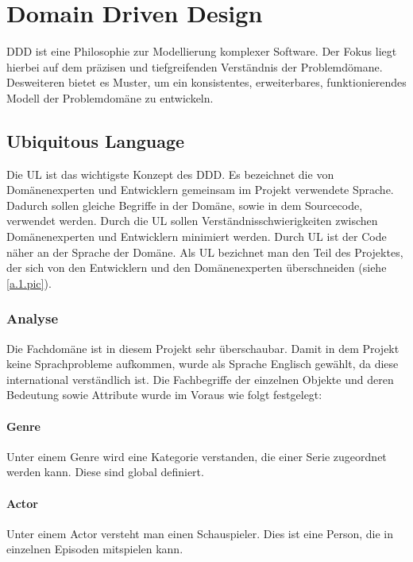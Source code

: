 
\chapter{Domain Driven Design}
\ac{DDD} ist eine Philosophie zur Modellierung komplexer Software. Der Fokus liegt hierbei auf dem präzisen und tiefgreifenden Verständnis der Problemdömane. Desweiteren bietet es Muster, um ein konsistentes, erweiterbares, funktionierendes Modell der Problemdomäne zu entwickeln.

\section{Ubiquitous Language}
Die \ac{UL} ist das wichtigste Konzept des \ac{DDD}. Es bezeichnet die von Domänenexperten und Entwicklern gemeinsam im Projekt verwendete Sprache. Dadurch sollen gleiche Begriffe in der Domäne, sowie in dem Sourcecode, verwendet werden. Durch die \ac{UL} sollen Verständnisschwierigkeiten zwischen Domänenexperten und Entwicklern minimiert werden. Durch \ac{UL} ist der Code näher an der Sprache der Domäne. Als \ac{UL} bezichnet man den Teil des Projektes, der sich von den Entwicklern und den Domänenexperten überschneiden (siehe \cref{a.1.pic}).

\subsection{Analyse}
Die Fachdomäne ist in diesem Projekt sehr überschaubar. Damit in dem Projekt keine Sprachprobleme aufkommen, wurde als Sprache Englisch gewählt, da diese international verständlich ist. Die Fachbegriffe der einzelnen Objekte und deren Bedeutung sowie Attribute wurde im Voraus wie folgt festgelegt:

\subsubsection{Genre}
Unter einem Genre wird eine Kategorie verstanden, die einer Serie zugeordnet werden kann. Diese sind global definiert.
\subsubsection{Actor}
Unter einem Actor versteht man einen Schauspieler. Dies ist eine Person, die in einzelnen Episoden mitspielen kann.
